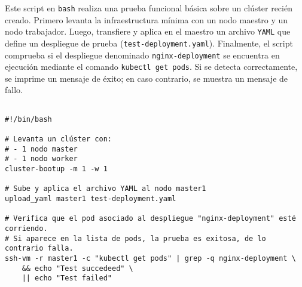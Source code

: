Este script en \texttt{bash} realiza una prueba funcional básica sobre un clúster recién creado. Primero levanta la infraestructura mínima con un nodo maestro y un nodo trabajador. Luego, transfiere y aplica en el maestro un archivo \texttt{YAML} que define un despliegue de prueba (\texttt{test-deployment.yaml}). Finalmente, el script comprueba si el despliegue denominado \texttt{nginx-deployment} se encuentra en ejecución mediante el comando \texttt{kubectl get pods}. Si se detecta correctamente, se imprime un mensaje de éxito; en caso contrario, se muestra un mensaje de fallo.  

\begin{verbatim}

#!/bin/bash

# Levanta un clúster con:
# - 1 nodo master
# - 1 nodo worker
cluster-bootup -m 1 -w 1

# Sube y aplica el archivo YAML al nodo master1
upload_yaml master1 test-deployment.yaml

# Verifica que el pod asociado al despliegue "nginx-deployment" esté corriendo.
# Si aparece en la lista de pods, la prueba es exitosa, de lo contrario falla.
ssh-vm -r master1 -c "kubectl get pods" | grep -q nginx-deployment \
    && echo "Test succedeed" \
    || echo "Test failed"

\end{verbatim}